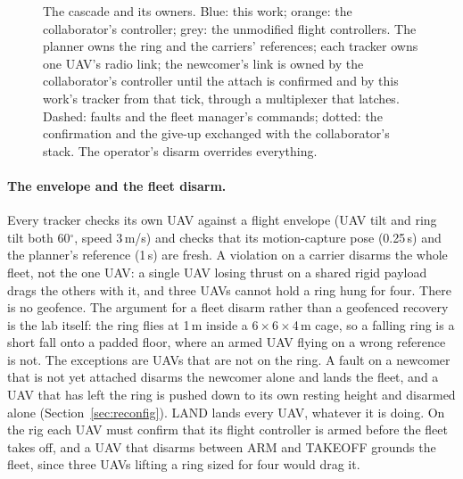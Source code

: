 \begin{figure}[htbp]
\caption[The cascade and its owners]{The cascade and its owners. Blue: this work; orange: the collaborator's
controller; grey: the unmodified flight controllers. The planner owns the ring and the carriers' references; each
tracker owns one UAV's radio link; the newcomer's link is owned by the collaborator's controller until the attach
is confirmed and by this work's tracker from that tick, through a multiplexer that latches. Dashed: faults and the
fleet manager's commands; dotted: the confirmation and the give-up exchanged with the collaborator's stack. The
operator's disarm overrides everything.}
\label{fig:owners}
\end{figure}

\paragraph{The envelope and the fleet disarm.} Every tracker checks its own UAV against a flight envelope (UAV tilt
and ring tilt both 60$^\circ$, speed 3\,m/s) and checks that its motion-capture pose (0.25\,s) and the planner's
reference (1\,s) are fresh. A violation on a carrier disarms the whole fleet, not the one UAV: a single UAV losing
thrust on a shared rigid payload drags the others with it, and three UAVs cannot hold a ring hung for four. There
is no geofence. The argument for a fleet disarm rather than a geofenced recovery is the lab itself: the ring flies
at 1\,m inside a 6\,$\times$\,6\,$\times$\,4\,m cage, so a falling ring is a short fall onto a padded floor, where an
armed UAV flying on a wrong reference is not. The exceptions are UAVs that are not on the ring. A fault on a
newcomer that is not yet attached disarms the newcomer alone and lands the fleet, and a UAV that has left the ring
is pushed down to its own resting height and disarmed alone (Section~\ref{sec:reconfig}). LAND lands every UAV,
whatever it is doing. On the rig each UAV must confirm that its flight controller is armed before the fleet takes
off, and a UAV that disarms between ARM and TAKEOFF grounds the fleet, since three UAVs lifting a ring sized for
four would drag it.

